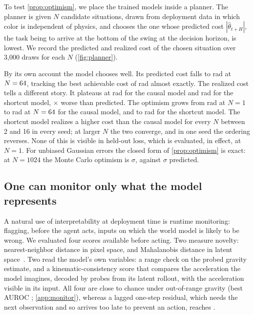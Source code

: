 \documentclass[11pt]{article}
\theoremstyle{definition}\newtheorem{definition}{Definition}
\begin{document}
To test \cref{prop:optimism}, we place the trained models inside a planner. The planner is given $N$ candidate situations, drawn from deployment data in which color is independent of physics, and chooses the one whose predicted cost $|\hat\theta_{t+H}|$, the task being to arrive at the bottom of the swing at the decision horizon, is lowest. We record the predicted and realized cost of the chosen situation over 3{,}000 draws for each $N$ (\cref{fig:planner}).

By its own account the model chooses well. Its predicted cost falls to \plPredClMean{} rad at $N=64$, tracking the best achievable cost of \plBestMean{} rad almost exactly. The realized cost tells a different story. It plateaus at \plRealClMean{} rad for the causal model and \plRealCoMean{} rad for the shortcut model, \plRatio$\times$ worse than predicted. The optimism grows from \plOptOneClMean{} rad at $N=1$ to \plOptClMean{} rad at $N=64$ for the causal model, and to \plOptCoMean{} rad for the shortcut model. The shortcut model realizes a higher cost than the causal model for every $N$ between 2 and 16 in every seed; at larger $N$ the two converge, and in one seed the ordering reverses. None of this is visible in held-out loss, which is evaluated, in effect, at $N=1$. For unbiased Gaussian errors the closed form of \cref{prop:optimism} is exact: at $N=1024$ the Monte Carlo optimism is \gcMC$\sigma$, against \gcExact$\sigma$ predicted.

\subsection{One can monitor only what the model represents}\label{sec:exp-monitor}
A natural use of interpretability at deployment time is runtime monitoring: flagging, before the agent acts, inputs on which the world model is likely to be wrong. We evaluated four scores available before acting. Two measure novelty: nearest-neighbor distance in pixel space, and Mahalanobis distance in latent space~\citep{lee2018mahalanobis}. Two read the model's own variables: a range check on the probed gravity estimate, and a kinematic-consistency score that compares the acceleration the model imagines, decoded by probes from its latent rollout, with the acceleration visible in its input. All four are close to chance under out-of-range gravity (best AUROC \aucClGKnnMean; \cref{app:monitor}), whereas a lagged one-step residual, which needs the next observation and so arrives too late to prevent an action, reaches \aucClGLagMean.
\end{document}
